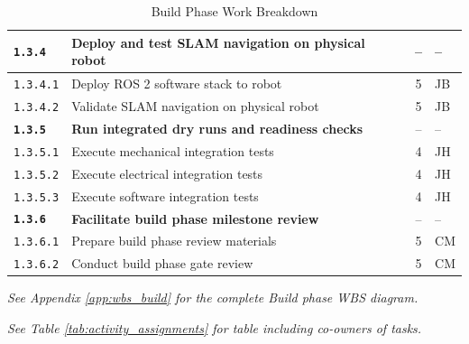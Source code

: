 \begin{table}[H]
\begin{tabular}{|l|p{6.5cm}|c|l|}
\hline
\rowcolor{buildorange!35}
\texttt{\textbf{1.3.4}} & \textbf{Deploy and test SLAM navigation on physical robot} & -- & -- \\
\hline
\rowcolor{buildorange!15}
\texttt{1.3.4.1} & \quad Deploy ROS 2 software stack to robot & 5 & JB \\
\hline
\rowcolor{white}
\texttt{1.3.4.2} & \quad Validate SLAM navigation on physical robot & 5 & JB \\
\hline
\rowcolor{buildorange!35}
\texttt{\textbf{1.3.5}} & \textbf{Run integrated dry runs and readiness checks} & -- & -- \\
\hline
\rowcolor{buildorange!15}
\texttt{1.3.5.1} & \quad Execute mechanical integration tests & 4 & JH \\
\hline
\rowcolor{white}
\texttt{1.3.5.2} & \quad Execute electrical integration tests & 4 & JH \\
\hline
\rowcolor{buildorange!15}
\texttt{1.3.5.3} & \quad Execute software integration tests & 4 & JH \\
\hline
\rowcolor{buildorange!35}
\texttt{\textbf{1.3.6}} & \textbf{Facilitate build phase milestone review} & -- & -- \\
\hline
\rowcolor{white}
\texttt{1.3.6.1} & \quad Prepare build phase review materials & 5 & CM \\
\hline
\rowcolor{buildorange!15}
\texttt{1.3.6.2} & \quad Conduct build phase gate review & 5 & CM \\
\hline
\end{tabular}
\caption{Build Phase Work Breakdown}
\label{tab:wbs_build}
\end{table}

\noindent\textit{See Appendix \ref{app:wbs_build} for the complete Build phase WBS diagram.}

\noindent\textit{See Table \ref{tab:activity_assignments} for table including co-owners of tasks.}